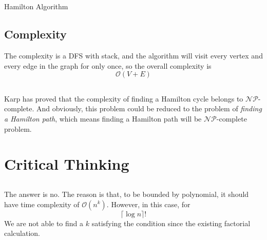 \documentclass[A4paper]{article}
\begin{document}
\subsection{}
\begin{algorithm}
\caption{Hamilton Algorithm}
\end{algorithm}
\newpage
\begin{flushleft}
\subsection{Complexity}
The complexity is a DFS with stack, and the algorithm will visit every vertex and every edge in the graph for only once, so the overall complexity is 
\[
 	\mathcal{O}(V+E)
 \] 
\end{flushleft}
\subsection{}
Karp has proved that the complexity of finding a Hamilton cycle belongs to $\mathcal{NP}$-complete. And obviously, this problem could be reduced to the problem of \textit{finding a Hamilton path}, which means finding a Hamilton path will be $\mathcal{NP}$-complete problem.

\section{Critical Thinking}
\subsection{}
The answer is no. The reason is that, to be bounded by polynomial, it should have time complexity of $\mathcal{O}(n^k)$. However, in this case, for\[
	\lceil \log n \rceil !
\] 
We are not able to find a $k$ satisfying the condition since the existing factorial calculation.
\end{document}

